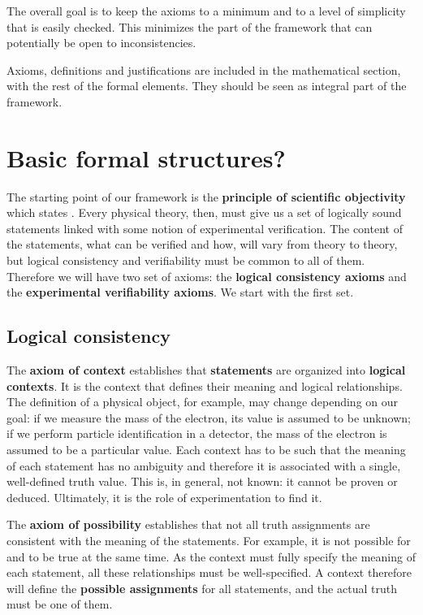 \documentclass[letterpaper]{article}
\begin{document}
The overall goal is to keep the axioms to a minimum and to a level of simplicity that is easily checked. This minimizes the part of the framework that can potentially be open to inconsistencies.

Axioms, definitions and justifications are included in the mathematical section, with the rest of the formal elements. They should be seen as integral part of the framework.

\section{Basic formal structures?}

The starting point of our framework is the \textbf{principle of scientific objectivity} which states . Every physical theory, then, must give us a set of logically sound statements linked with some notion of experimental verification. The content of the statements, what can be verified and how, will vary from theory to theory, but logical consistency and verifiability must be common to all of them. Therefore we will have two set of axioms: the \textbf{logical consistency axioms} and the \textbf{experimental verifiability axioms}. We start with the first set.

\subsection{Logical consistency}

The \textbf{axiom of context} establishes that \textbf{statements} are organized into \textbf{logical contexts}. It is the context that defines their meaning and logical relationships. The definition of a physical object, for example, may change depending on our goal: if we measure the mass of the electron, its value is assumed to be unknown; if we perform particle identification in a detector, the mass of the electron is assumed to be a particular value. Each context has to be such that the meaning of each statement has no ambiguity and therefore it is associated with a single, well-defined truth value. This is, in general, not known: it cannot be proven or deduced. Ultimately, it is the role of experimentation to find it.

The \textbf{axiom of possibility} establishes that not all truth assignments are consistent with the meaning of the statements. For example, it is not possible for  and  to be true at the same time. As the context must fully specify the meaning of each statement, all these relationships must be well-specified. A context therefore will define the \textbf{possible assignments} for all statements, and the actual truth must be one of them.
\end{document}
